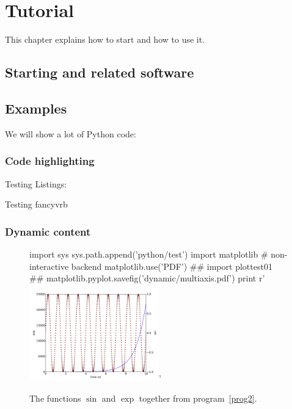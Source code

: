 \chapter{Tutorial}\label{chap:tutorial}
This chapter explains how to start \Pink and how to use it.

\section{Starting \Pink and related software}


\section{Examples}

We will show a lot of Python code:
\subsection{Code highlighting}
Testing Listings:


Testing fancyvrb
\lstset{language=Python}





\subsection{Dynamic content}
\begin{figure}
\centering
\begin{python}
import sys
sys.path.append('python/test')
import matplotlib
# non-interactive backend
matplotlib.use('PDF') 
##
import plottest01
##
matplotlib.pyplot.savefig('dynamic/multiaxis.pdf')
print r'\includegraphics[width=0.5\textwidth]{dynamic/multiaxis.pdf}'
\end{python}
\caption{The functions $\sin$ and $\exp$ together from program~\ref{prog2}.\label{fig:plot2}}
\end{figure}

